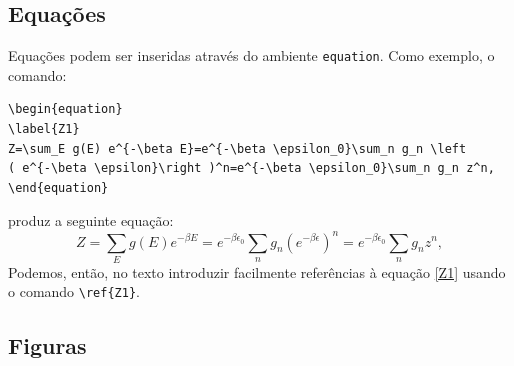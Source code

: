\subsection{Equações}

Equações podem ser inseridas através do ambiente \verb+equation+. Como exemplo, o comando:
\begin{verbatim}
\begin{equation}
\label{Z1}
Z=\sum_E g(E) e^{-\beta E}=e^{-\beta \epsilon_0}\sum_n g_n \left 
( e^{-\beta \epsilon}\right )^n=e^{-\beta \epsilon_0}\sum_n g_n z^n,
\end{equation}
\end{verbatim}
produz a seguinte equação:
\begin{equation}
\label{Z1}
Z=\sum_E g(E) e^{-\beta E}=e^{-\beta \epsilon_0}\sum_n g_n \left 
( e^{-\beta \epsilon}\right )^n=e^{-\beta \epsilon_0}\sum_n g_n z^n,
\end{equation}
Podemos, então, no texto introduzir facilmente referências à equação \ref{Z1} usando o comando \verb+\ref{Z1}+.

\subsection{Figuras}

